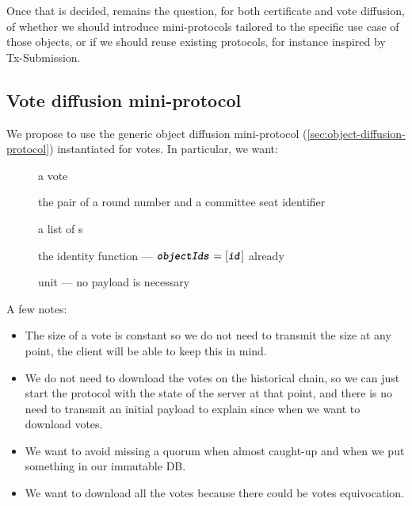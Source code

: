 Once that is decided, remains the question, for both certificate and vote
diffusion, of whether we should introduce mini-protocols tailored to the
specific use case of those objects, or if we should reuse existing protocols,
for instance inspired by Tx-Submission.


\subsection{Vote diffusion mini-protocol}%
\label{sec:vote-diffusion}

We propose to use the generic object diffusion mini-protocol
(\autoref{sec:object-diffusion-protocol}) instantiated for votes. In particular,
we want:
%
\begin{description}
\item[] a vote
\item[] the pair of a round number and a committee seat
  identifier
\item[] a list of s
\item[] the identity function --- \(\textbf{\texttt{\textit{objectIds}}} =
  [\textbf{\texttt{\textit{id}}}]\) already
\item[] unit --- no payload is necessary
\end{description}

A few notes:

\begin{itemize}
\item The size of a vote is constant so we do not need to transmit the size at
  any point, the client will be able to keep this in mind.

\item We do not need to download the votes on the historical chain, so we can
  just start the protocol with the state of the server at that point, and there
  is no need to transmit an initial payload to explain since when we want to
  download votes.

\item We want to avoid missing a quorum when almost caught-up and when we put
  something in our immutable DB.

\item We want to download all the votes because there could be votes
  equivocation.
\end{itemize}

